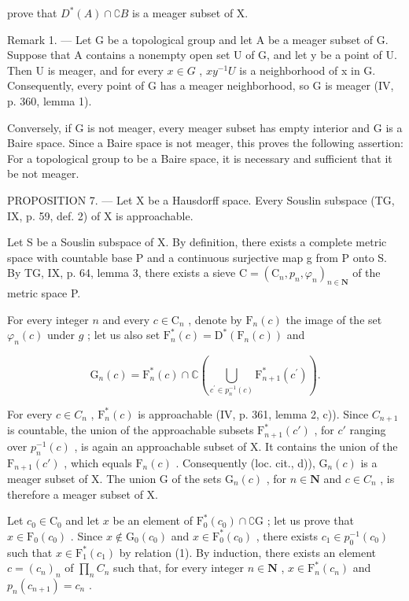 prove that \(D^{*}(A) \cap \complement B\) is a meager subset of X.

Remark 1. --- Let G be a topological group and let A be a meager subset of G. Suppose that A contains a nonempty open set U of G, and let y be a point of U. Then U is meager, and for every \(x \in G\) , \(xy^{-1}U\) is a neighborhood of x in G. Consequently, every point of G has a meager neighborhood, so G is meager (IV, p. 360, lemma 1).

Conversely, if G is not meager, every meager subset has empty interior and G is a Baire space. Since a Baire space is not meager, this proves the following assertion: For a topological group to be a Baire space, it is necessary and sufficient that it be not meager.

PROPOSITION 7. --- Let X be a Hausdorff space. Every Souslin subspace (TG, IX, p. 59, def. 2) of X is approachable.

Let S be a Souslin subspace of X. By definition, there exists a complete metric space with countable base P and a continuous surjective map g from P onto S. By TG, IX, p. 64, lemma 3, there exists a sieve \(\mathrm{C} = (\mathrm{C}_{n}, p_{n}, \varphi_{n})_{n \in \mathbf{N}}\) of the metric space P.

For every integer \(n\) and every \(c \in \mathrm{C}_n\) , denote by \(\mathrm{F}_n(c)\) the image of the set \(\varphi_n(c)\) under \(g\) ; let us also set \(\mathrm{F}_n^*(c) = \mathrm{D}^*(\mathrm{F}_n(c))\) and

\[
\mathrm{G} _ {n} (c) = \mathrm{F} _ {n} ^ {*} (c) \cap \mathbb {C} \left(\bigcup_ {c ^ {\prime} \in p _ {n} ^ {- 1} (c)} \mathrm{F} _ {n + 1} ^ {*} (c ^ {\prime})\right).\tag{1}
\]

For every \(c \in C_{n}\) , \(\mathrm{F}_{n}^{*}(c)\) is approachable (IV, p. 361, lemma 2, c)). Since \(C_{n+1}\) is countable, the union of the approachable subsets \(\mathrm{F}_{n+1}^{*}(c')\) , for \(c'\) ranging over \(p_{n}^{-1}(c)\) , is again an approachable subset of X. It contains the union of the \(\mathrm{F}_{n+1}(c')\) , which equals \(\mathrm{F}_{n}(c)\) . Consequently (loc. cit., d)), \(\mathrm{G}_{n}(c)\) is a meager subset of X. The union G of the sets \(\mathrm{G}_{n}(c)\) , for \(n \in \mathbf{N}\) and \(c \in C_{n}\) , is therefore a meager subset of X.

Let \(c_0 \in \mathrm{C}_0\) and let \(x\) be an element of \(\mathrm{F}_0^*(c_0) \cap \complement \mathrm{G}\) ; let us prove that \(x \in \mathrm{F}_0(c_0)\) . Since \(x \notin \mathrm{G}_0(c_0)\) and \(x \in \mathrm{F}_0^*(c_0)\) , there exists \(c_1 \in p_0^{-1}(c_0)\) such that \(x \in \mathrm{F}_1^*(c_1)\) by relation (1). By induction, there exists an element \(c = (c_n)_n\) of \(\prod_n C_n\) such that, for every integer \(n \in \mathbf{N}\) , \(x \in \mathrm{F}_n^*(c_n)\) and \(p_n(c_{n+1}) = c_n\) .

